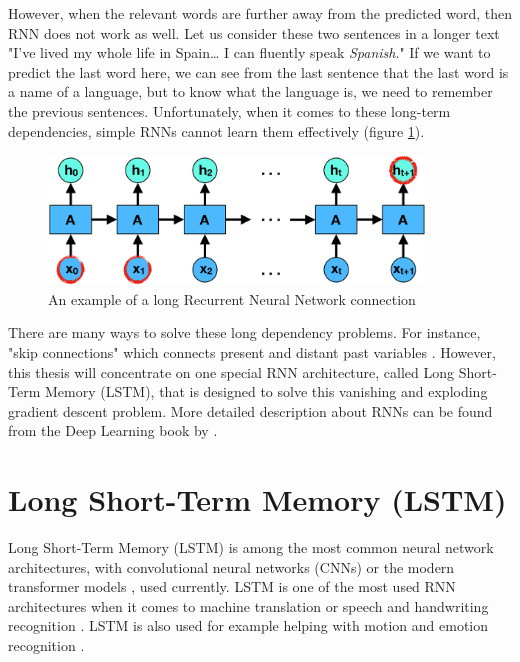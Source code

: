 However, when the relevant words are further away from the predicted word, then RNN does not work as well. Let us consider these two sentences in a longer text "I've lived my whole life in Spain… I can fluently speak \emph{Spanish}." If we want to predict the last word here, we can see from the last sentence that the last word is a name of a language, but to know what the language is, we need to remember the previous sentences. Unfortunately, when it comes to these long-term dependencies, simple RNNs cannot learn them effectively (figure \ref{fig:rnn_long}). \parencite{bengio1993problem,bengio1994learning}

\begin{figure}[h]
    \centering
    \includegraphics[width=10cm,height=\textheight,keepaspectratio]{rnn_long}
    \caption{An example of a long Recurrent Neural Network connection}
    \label{fig:rnn_long}
\end{figure}

There are many ways to solve these long dependency problems. For instance, "skip connections" which connects present and distant past variables \parencite{lin1996learning}. However, this thesis will concentrate on one special RNN architecture, called Long Short-Term Memory (LSTM), that is designed to solve this vanishing and exploding gradient descent problem. More detailed description about RNNs can be found from the Deep Learning book by \textcite{goodfellow2016deep}.


\section{Long Short-Term Memory (LSTM)}
\label{sec:lstm}

Long Short-Term Memory (LSTM) \parencite{hochreiter1997long} is among the most common neural network architectures, with convolutional neural networks (CNNs) \parencite{fukushima1980neocognitron,lecun1999object} or the modern transformer models \parencite{vaswani2017attention,devlin2018bert}, used currently. LSTM is one of the most used RNN architectures when it comes to machine translation \parencite{sutskever2014sequence} or speech \parencite{graves2014towards,graves2013speech} and handwriting recognition \parencite{carbune2020fast,graves2013generating,graves2009offline}. LSTM is also used for example helping with motion \parencite{ullah2017action} and emotion recognition \parencite{liu2018multi,fan2016video}.

